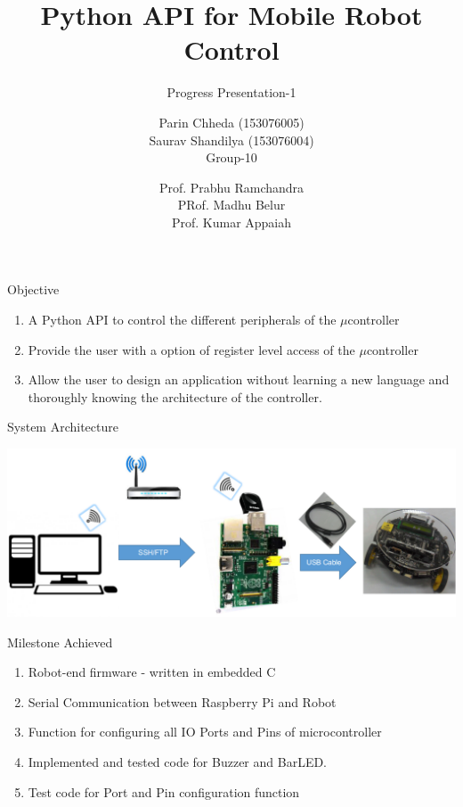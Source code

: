 \documentclass[10pt,handout,english]{beamer}
\title[] %
{Python API for Mobile Robot Control}
\subtitle{Progress Presentation-1}
\author[AE-663 Course Project ] %
{Parin Chheda (153076005) \\ Saurav Shandilya (153076004) \\ Group-10 }
\institute [Indian Institute of Technology Bombay]%
{
  
}
\date[\today] %
{Prof. Prabhu Ramchandra \\ PRof. Madhu Belur \\ Prof. Kumar Appaiah}
\begin{document}
\frame{\titlepage}

\begin{frame}{Objective}
\begin{enumerate}
	\item A Python API to control the different peripherals of the ${\mu}$controller
	\item Provide the user with a option of register level access of the ${\mu}$controller
	\item Allow the user to design an application without learning a new language and thoroughly knowing the architecture of the controller.
\end{enumerate}
\end{frame}

\begin{frame}{System Architecture}

\includegraphics[scale = 0.35]{system_diagram}

\end{frame}

\begin{frame}{Milestone Achieved}
\begin{enumerate}
\item Robot-end firmware - written in embedded C
\item Serial Communication between Raspberry Pi and Robot
\item Function for configuring all IO Ports and Pins of microcontroller
\item Implemented and tested code for Buzzer and BarLED.  
\item Test code for Port and Pin configuration function
\end{enumerate}

\end{frame}
\end{document}
